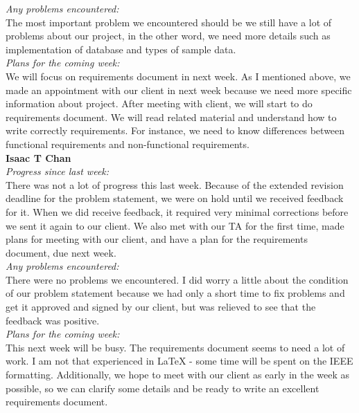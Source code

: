 \noindent\textit{Any problems encountered:}\\
The most important problem we encountered should be we still have a lot of problems about our project, in the other word, we need more details such as implementation of database and types of sample data.\\ 

\noindent\textit{Plans for the coming week:}\\
We will focus on requirements document in next week.  As I mentioned above, we made an appointment with our client in next week because we need more specific information about project. After meeting with client, we will start to do requirements document. We will read related material and understand how to write correctly requirements. For instance, we need to know differences between functional requirements and non-functional requirements.\\

\noindent\textbf{Isaac T Chan}\\
\noindent\textit{Progress since last week:}\\
There was not a lot of progress this last week. Because of the extended revision deadline for the problem statement, we were on hold until we received feedback for it. When we did receive feedback, it required very minimal corrections before we sent it again to our client. We also met with our TA for the first time, made plans for meeting with our client, and have a plan for the requirements document, due next week.\\

\noindent\textit{Any problems encountered:}\\
There were no problems we encountered. I did worry a little about the condition of our problem statement because we had only a short time to fix problems and get it approved and signed by our client, but was relieved to see that the feedback was positive.\\

\noindent\textit{Plans for the coming week:}\\
This next week will be busy. The requirements document seems to need a lot of work. I am not that experienced in LaTeX - some time will be spent on the IEEE formatting. Additionally, we hope to meet with our client as early in the week as possible, so we can clarify some details and be ready to write an excellent requirements document.\\ 

